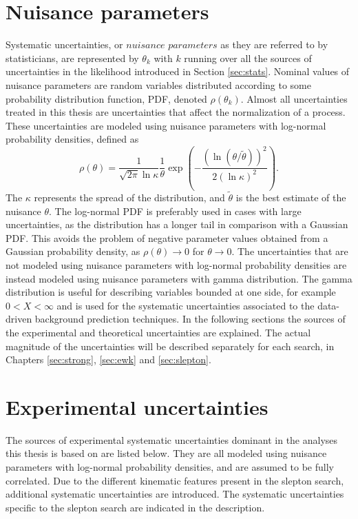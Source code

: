 \section{Nuisance parameters}
\noindent\justify
Systematic uncertainties, or $nuisance$ $parameters$ as they are referred to by statisticians, are represented by $\theta_{k}$ with $k$ running over all the sources of uncertainties \cite{Lista:2016chp} in the likelihood introduced in Section \ref{sec:stats}.                                         
Nominal values of nuisance parameters are random variables distributed according to some probability distribution function, PDF, denoted $\rho(\theta_{k})$. 
Almost all uncertainties treated in this thesis are uncertainties that affect the normalization of a process. 
These uncertainties are modeled using nuisance parameters with log-normal probability densities, defined as
\begin{equation}
\rho(\theta)=\frac{1}{\sqrt{2\pi}\ln \kappa }\frac{1}{\theta}\exp\left(-\frac{(\ln(\theta/\tilde{\theta}))^{2}}{2(\ln \kappa)^{2}}\right).
\end{equation}   
The $\kappa$ represents the spread of the distribution, and $\tilde{\theta}$ is the best estimate of the nuisance $\theta$. 
The log-normal PDF is preferably used in cases with large uncertainties, as the distribution has a longer tail in comparison with a Gaussian PDF. 
This avoids the problem of negative parameter values obtained from a Gaussian probability density, as $\rho(\theta)\rightarrow0$ for $\theta\rightarrow0$.
The uncertainties that are not modeled using nuisance parameters with log-normal probability densities are instead modeled using nuisance parameters with gamma distribution.
The gamma distribution is useful for describing variables bounded at one side, for example $0<X<\infty$ and is used for the systematic uncertainties associated to the data-driven background prediction techniques. 
\newpara
\noindent\justify
In the following sections the sources of the experimental and theoretical uncertainties are explained. 
The actual magnitude of the uncertainties will be described separately for each search, in Chapters \ref{sec:strong}, \ref{sec:ewk} and \ref{sec:slepton}. 
\section{Experimental uncertainties}
\noindent\justify
The sources of experimental systematic uncertainties dominant in the analyses this thesis is based on are listed below. 
They are all modeled using nuisance parameters with log-normal probability densities, and are assumed to be fully correlated. 
Due to the different kinematic features present in the slepton search, additional systematic uncertainties are introduced. 
The systematic uncertainties specific to the slepton search are indicated in the description. 
